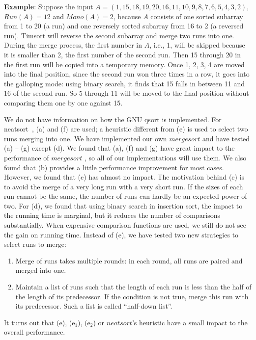 \documentclass[AMA,STIX1COL]{WileyNJD-v2}
\newcommand{\msort}{$mergesort$ }
\begin{document}
\textbf{Example}: Suppose the input $A = (1, 15, 18, 19, 20, 16, 11, 10, 9, 8, 7, 6, 5, 4, 3, 2)$, $Run(A) = 12$ and $Mono(A) = 2$, because $A$ consists of one sorted subarray from 1 to 20 (a run) and one reversely sorted subarray from 16 to 2 (a reversed run).
Timsort will reverse the second subarray and merge two runs into one. 
During the merge process, the first number in $A$, i.e., 1, will be skipped because it is smaller than 2, the first number of the second run. 
Then 15 through 20 in the first run will be copied into a temporary memory. 
Once 1, 2, 3, 4 are moved into the final position, since the second run won three times in a row,  it goes into the galloping mode: using binary search, it finds that 15 falls in between 11 and 16 of the second run. 
So 5 through 11 will be moved to the final position without comparing them one by one against 15. 

We do not have information on how the GNU qsort is implemented. 
For neatsort~\cite{la2014neatsort}, (a) and (f) are used; a heuristic different from (e) is used to select two runs merging into one. We have implemented our own \msort and have tested (a) – (g) except (d). We found that (a), (f) and (g) have great impact to the performance of \msort, so all of our implementations will use them. 
We also found that (b) provides a little performance improvement for most cases. 
However, we found that (c) has almost no impact. 
The motivation behind (c) is to avoid the merge of a very long run with a very short run. 
If the sizes of each run cannot be the same, the number of runs can hardly be an expected power of two. 
For (d), we found that using binary search in insertion sort, the impact to the running time is marginal, but it reduces the number of comparisons substantially. 
When expensive comparison functions are used, we still do not see the gain on running time. Instead of (e), we have tested two new strategies to select runs to merge:
\begin{enumerate}[(e$_1$)]
\item Merge of runs takes multiple rounds: in each round, all runs are paired and merged into one.
\item Maintain a list of runs such that the length of each run is less than the half of the length of its predecessor. If the condition is not true, merge this run with its predecessor. Such a list is called “half-down list”.
\end{enumerate}

It turns out that (e), (e$_1$), (e$_2$) or $neatsort$’s heuristic have a small impact to the overall performance.
\end{document}
